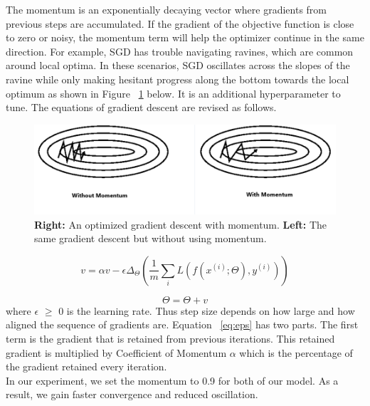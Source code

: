 The momentum is an exponentially decaying vector where gradients from
previous steps are accumulated. If the gradient of the objective function is
close to zero or noisy, the momentum term will help the optimizer continue in
the same direction. For example, SGD has trouble navigating ravines, which are common around local optima. In these scenarios, SGD oscillates across the slopes of the ravine while only making hesitant progress along the bottom towards the local optimum as shown in Figure ~\ref{fig:momentum} below.  It is an additional
hyperparameter to tune. The equations of gradient descent are revised as follows.
\begin{figure}[ht]
\centering
\includegraphics[width=0.80\columnwidth]{Figures/mm.png}
\decoRule
\caption[\textbf{Right:} An optimized gradient descent with momentum. \textbf{Left:} The same gradient descent but without using momentum.]{\textbf{Right:} An optimized gradient descent with momentum. \textbf{Left:} The same gradient descent but without using momentum.}
\label{fig:momentum}
\end{figure}
\begin{equation}\label{eq:eps}
     v=\alpha v-\epsilon \Delta _{\Theta }(\frac{1}{m}\sum _{i}L(f(x^{(i)};\Theta ),y^{(i)}))
\end{equation}

\begin{equation}
    \Theta =\Theta +v
\end{equation}
where $\epsilon$ $\geq$ 0 is the learning rate. Thus step size depends on how large and how aligned the sequence of gradients are.
Equation ~\ref{eq:eps} has two parts. The first term is the gradient that is retained from previous iterations. This retained gradient is multiplied by Coefficient of Momentum $\alpha$ which is the percentage of the gradient retained every iteration.\\

In our experiment, we set the momentum to 0.9 for both of our model. As a result, we gain faster convergence and reduced oscillation.


